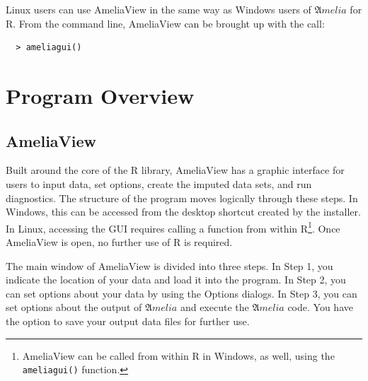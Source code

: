 \documentclass[12pt,titlepage]{article}
\newcommand{\Amelia}{\ensuremath{\mathfrak Amelia} }
\begin{document}
Linux users can use AmeliaView in the same way as Windows users of
\Amelia for R.  From the command line, AmeliaView can be brought up
with the call:
  \begin{verbatim}
  > ameliagui()
  \end{verbatim}

\section{Program Overview}
\label{sec:overview}

\subsection{AmeliaView}
\label{sec:guioverview}
Built around the core of the R library, AmeliaView has a graphic
interface for users to input data, set options, create the imputed
data sets, and run diagnostics.  The structure of the program moves
logically through these steps.  In Windows, this can be accessed from
the desktop shortcut created by the installer.  In Linux, accessing
the GUI requires calling a function from within R\footnote{AmeliaView
  can be called from within R in Windows, as well, using the
  \texttt{ameliagui()} function.}.  Once AmeliaView is open, no
further use of R is required.

The main window of AmeliaView is divided into three steps.  In Step 1,
you indicate the location of your data and load it into the program.
In Step 2, you can set options about your data by using the Options
dialogs.  In Step 3, you can set options about the output of
${\mathfrak Amelia}$ and execute the ${\mathfrak Amelia}$ code.  You
have the option to save your output data files for further use.
\end{document}
